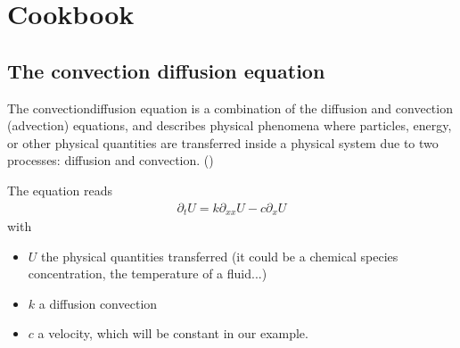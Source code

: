\documentclass[letterpaper,10pt,english]{sphinxmanual}
\begin{document}
\chapter{Cookbook}
\label{\detokenize{cookbook:cookbook}}\label{\detokenize{cookbook::doc}}

\section{The convection diffusion equation}
\label{\detokenize{cookbook/advection_diffusion:the-convection-diffusion-equation}}\label{\detokenize{cookbook/advection_diffusion::doc}}
\begin{sphinxVerbatim}[commandchars=\\\{\}]
   
   
 

   
   

   

      


 
\end{sphinxVerbatim}

The convection\textendash{}diffusion equation is a combination of the diffusion and
convection (advection) equations, and describes physical phenomena where
particles, energy, or other physical quantities are transferred inside a
physical system due to two processes: diffusion and convection.
()

The equation reads
\begin{equation*}
\begin{split}\partial_{t}U = k \partial_{xx} U - c \partial_{x} U\end{split}
\end{equation*}
with
\begin{itemize}
\item {} 
\(U\) the physical quantities transferred (it could be a chemical
species concentration, the temperature of a fluid...)

\item {} 
\(k\) a diffusion convection

\item {} 
\(c\) a velocity, which will be constant in our example.

\end{itemize}
\end{document}
